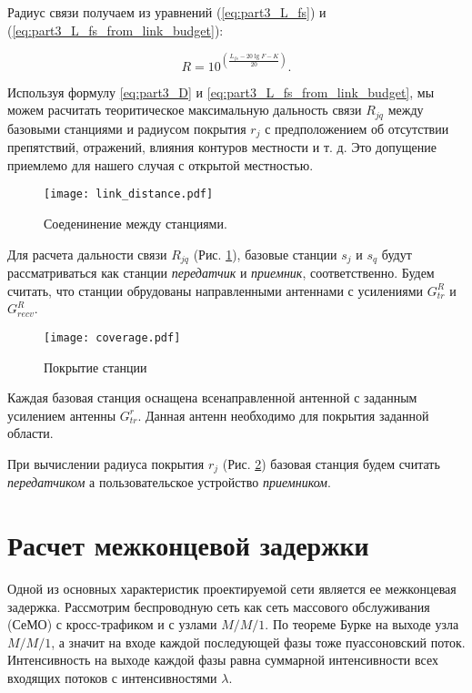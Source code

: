 Радиус связи получаем из уравнений (\cref{eq:part3_L_fs}) и (\cref{eq:part3_L_fs_from_link_budget}):

\begin{equation}
  \label{eq:part3_D}
  R = 10^{\left(\frac{L_{fs} - 20\lg{F} - K}{20}\right)}.
\end{equation}

Используя формулу \cref{eq:part3_D} и \cref{eq:part3_L_fs_from_link_budget}, мы можем расчитать теоритическое максимальную дальность связи $ R_{jq}$ между базовыми станциями и радиусом покрытия $ r_j $ с предположением об отсутствии препятствий, отражений, влияния контуров местности и т. д. Это допущение приемлемо для нашего случая с открытой местностью.

\begin{figure}[h!]
  \centering
   \texttt{[image: link\_distance.pdf]}
\caption{Соеденинение между станциями.}
\label{fig:part3_link_distance}
\end{figure}

Для расчета дальности связи $R_{jq}$ (Рис. \cref{fig:part3_link_distance}), базовые станции $s_j$ и $s_q$ будут рассматриваться как станции \textit{передатчик} и \textit{приемник}, соответственно. Будем считать, что станции обрудованы направленными антеннами с усилениями $G_{tr}^{R}$ и $G_{recv}^{R}$.

\begin{figure}[h!]
  \centering
   \texttt{[image: coverage.pdf]}
\caption{Покрытие станции}
\label{fig:part3_coverage}
\end{figure}

Каждая базовая станция оснащена всенаправленной антенной с заданным усилением антенны $G_ {tr}^{r}$. Данная антенн необходимо для покрытия заданной области.


При вычислении радиуса покрытия $r_j$ (Рис.  \cref{fig:part3_coverage}) базовая станция будем считать \textit{передатчиком} а пользовательское устройство \textit{приемником}.

\section{Расчет межконцевой задержки}\label{part4_e2e_delay_section}

Одной из основных характеристик проектируемой сети является ее межконцевая задержка. Рассмотрим беспроводную сеть как сеть массового обслуживания (СеМО) с кросс-трафиком и с узлами $M/M/1$. По теореме Бурке \cite{Burke1956} на выходе узла $M/M/1$, а значит на входе каждой последующей фазы тоже пуассоновский поток. Интенсивность на выходе каждой фазы равна суммарной интенсивности всех входящих потоков с интенсивностями $\lambda$.

